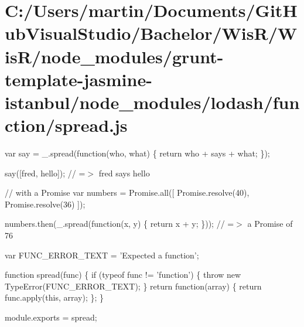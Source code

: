 \hypertarget{_c_1_2_users_2martin_2_documents_2_git_hub_visual_studio_2_bachelor_2_wis_r_2_wis_r_2node_moduledd8546a9fdd71b66a049e9e09d68138d}{}\section{C\+:/\+Users/martin/\+Documents/\+Git\+Hub\+Visual\+Studio/\+Bachelor/\+Wis\+R/\+Wis\+R/node\+\_\+modules/grunt-\/template-\/jasmine-\/istanbul/node\+\_\+modules/lodash/function/spread.\+js}
var say = \+\_\+.\+spread(function(who, what) \{ return who + \textquotesingle{} says \textquotesingle{} + what; \});

say(\mbox{[}\textquotesingle{}fred\textquotesingle{}, \textquotesingle{}hello\textquotesingle{}\mbox{]}); // =$>$ \textquotesingle{}fred says hello\textquotesingle{}

// with a Promise var numbers = Promise.\+all(\mbox{[} Promise.\+resolve(40), Promise.\+resolve(36) \mbox{]});

numbers.\+then(\+\_\+.\+spread(function(x, y) \{ return x + y; \})); // =$>$ a Promise of 76


\begin{DoxyCodeInclude}

var FUNC\_ERROR\_TEXT = \textcolor{stringliteral}{'Expected a function'};

\textcolor{keyword}{function} spread(func) \{
  \textcolor{keywordflow}{if} (typeof func != \textcolor{stringliteral}{'function'}) \{
    \textcolor{keywordflow}{throw} \textcolor{keyword}{new} TypeError(FUNC\_ERROR\_TEXT);
  \}
  \textcolor{keywordflow}{return} \textcolor{keyword}{function}(array) \{
    \textcolor{keywordflow}{return} func.apply(\textcolor{keyword}{this}, array);
  \};
\}

module.exports = spread;
\end{DoxyCodeInclude}
 